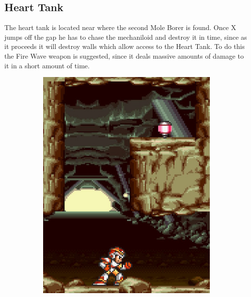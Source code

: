 \subsection{Heart Tank}
The heart tank is located near where the second Mole Borer is found. Once  X jumps off the gap he has to chase the mechaniloid and destroy it in time, since as it proceeds it will destroy walls which allow access to the Heart Tank. To do this the Fire Wave weapon is suggested, since it deals massive amounts of damage to it in a short amount of time. 
\begin{figure}[htp]
	\centering
	\begin{subfigure}{0.3\linewidth}
		\centering
		\includegraphics[width=\linewidth]{figures/X1/Armored_armadillo/Armadillo_heart.jpg}
		\caption{}
	\end{subfigure}
	\begin{subfigure}{0.3\textwidth}
		\centering

\end{subfigure}
\end{figure}
